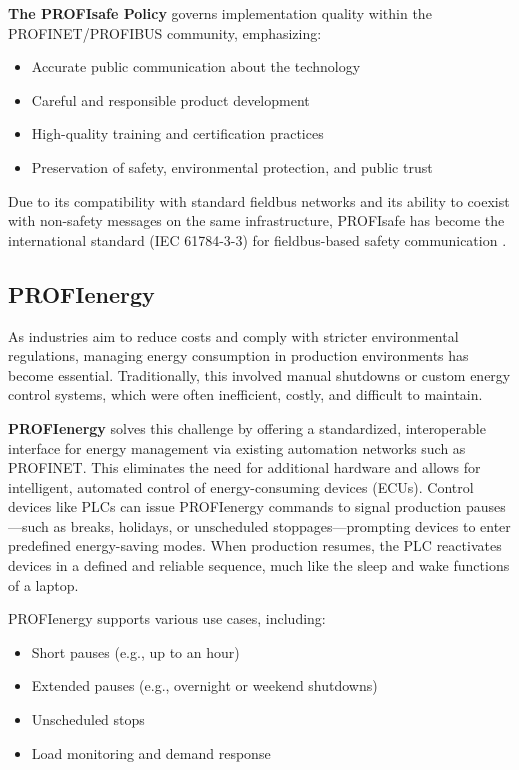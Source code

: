 \documentclass[conference]{IEEEtran}
\begin{document}
\textbf{The PROFIsafe Policy} governs implementation quality within the PROFINET/PROFIBUS community, emphasizing:
\begin{itemize}
    \item Accurate public communication about the technology
    \item Careful and responsible product development
    \item High-quality training and certification practices
    \item Preservation of safety, environmental protection, and public trust
\end{itemize}

Due to its compatibility with standard fieldbus networks and its ability to coexist with non-safety messages on the same infrastructure, PROFIsafe has become the international standard (IEC 61784-3-3) for fieldbus-based safety communication \cite{profinet_profisafe}.



\subsection{PROFIenergy}
\label{subsec: PROFIenergy}
As industries aim to reduce costs and comply with stricter environmental regulations, managing energy consumption in production environments has become essential. Traditionally, this involved manual shutdowns or custom energy control systems, which were often inefficient, costly, and difficult to maintain.

\textbf{PROFIenergy} solves this challenge by offering a standardized, interoperable interface for energy management via existing automation networks such as PROFINET. This eliminates the need for additional hardware and allows for intelligent, automated control of energy-consuming devices (ECUs). Control devices like PLCs can issue PROFIenergy commands to signal production pauses—such as breaks, holidays, or unscheduled stoppages—prompting devices to enter predefined energy-saving modes. When production resumes, the PLC reactivates devices in a defined and reliable sequence, much like the sleep and wake functions of a laptop.

PROFIenergy supports various use cases, including:
\begin{itemize}
    \item Short pauses (e.g., up to an hour)
    \item Extended pauses (e.g., overnight or weekend shutdowns)
    \item Unscheduled stops
    \item Load monitoring and demand response
\end{itemize}
\end{document}
